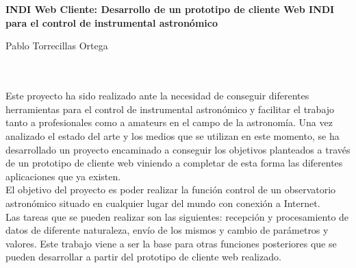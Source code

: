 \chapter*{}






\cleardoublepage
\thispagestyle{empty}

\begin{center}
{\large\bfseries INDI Web Cliente: Desarrollo de un prototipo de cliente Web INDI para el control de instrumental astronómico}\\
\end{center}
\begin{center}
Pablo Torrecillas Ortega\\
\end{center}

\\

\vspace{0.7cm}
\\

Este proyecto ha sido realizado ante la necesidad de conseguir diferentes herramientas para el control de instrumental astronómico y facilitar el trabajo tanto a profesionales como a amateurs en el campo de la astronomía. Una vez analizado el estado del arte y los medios que se utilizan en este momento, se ha desarrollado un proyecto encaminado a conseguir los objetivos planteados a través de un prototipo de cliente web viniendo a completar de esta forma las diferentes aplicaciones que ya existen.\\

El objetivo del proyecto es poder realizar la función control de un observatorio astronómico situado en cualquier lugar del mundo con conexión a Internet.\\
Las tareas que se pueden realizar son las siguientes: recepción y procesamiento de datos de diferente naturaleza, envío de los mismos y cambio de parámetros y valores. Este trabajo viene a ser la base para otras funciones posteriores que se pueden desarrollar a partir del prototipo de cliente web realizado.\\

